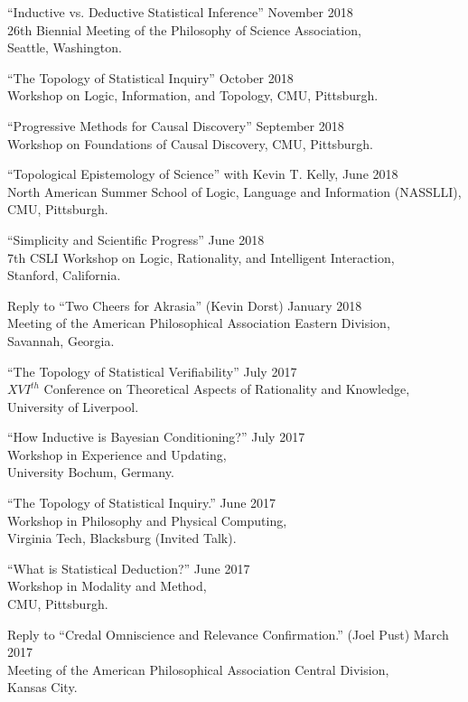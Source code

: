 \documentclass[12pt]{res} %
\begin{document}
\begin{resume}
``Inductive vs. Deductive Statistical Inference'' \hfill November 2018\\
26th Biennial Meeting of the Philosophy of Science Association,\\
Seattle, Washington.

``The Topology of Statistical Inquiry'' \hfill October 2018\\
Workshop on Logic, Information, and Topology,
CMU, Pittsburgh.

``Progressive Methods for Causal Discovery'' \hfill September 2018\\
Workshop on Foundations of Causal Discovery,
CMU, Pittsburgh.

``Topological Epistemology of Science'' with Kevin T. Kelly,  \hfill June  2018\\
North American Summer School of Logic, Language and Information (NASSLLI),\\
CMU, Pittsburgh.

``Simplicity and Scientific Progress'' \hfill June 2018\\
7th CSLI Workshop on Logic, Rationality, and Intelligent Interaction,\\
Stanford, California.

Reply to ``Two Cheers for Akrasia'' (Kevin Dorst) \hfill January 2018\\
Meeting of the American Philosophical Association Eastern Division,\\ 
Savannah, Georgia.

``The Topology of Statistical Verifiability'' \hfill July 2017\\
$XVI^{th}$ Conference on Theoretical Aspects of Rationality and Knowledge,\\
University of Liverpool. 

``How Inductive is Bayesian Conditioning?'' \hfill July 2017\\
Workshop in Experience and Updating,\\
University Bochum, Germany.

``The Topology of Statistical Inquiry.'' \hfill June 2017\\
Workshop in Philosophy and Physical Computing, \\
Virginia Tech, Blacksburg (Invited Talk).

``What is Statistical Deduction?'' \hfill June 2017\\
Workshop in Modality and Method, \\
CMU, Pittsburgh.

Reply to ``Credal Omniscience and Relevance Confirmation.'' (Joel Pust) \hfill March 2017\\
Meeting of the American Philosophical Association Central Division,\\ 
Kansas City.


\end{resume}
\end{document}

